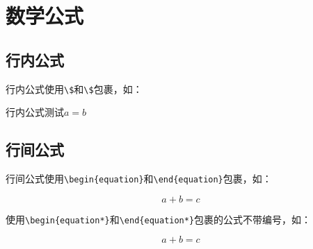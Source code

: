 \chapter{数学公式}\label{chap:math}
\section{行内公式}\label{sec:inline}
行内公式使用\lstinline|\$|和\lstinline|\$|包裹，如：

\begin{codeshow}
    行内公式测试$a=b$
\end{codeshow}

\section{行间公式}\label{sec:display}
行间公式使用\lstinline|\begin{equation}|和\lstinline|\end{equation}|包裹，如：

\begin{codeshow}
    \begin{equation}
        a+b=c
    \end{equation}
\end{codeshow}

使用\lstinline|\begin{equation*}|和\lstinline|\end{equation*}|包裹的公式不带编号，如：

\begin{codeshow}
    \begin{equation*}
        a+b=c
    \end{equation*}
\end{codeshow}